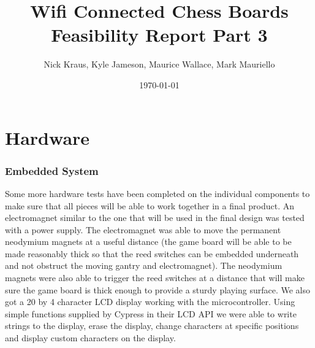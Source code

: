 \documentclass{article}
\title{Wifi Connected Chess Boards \\ \large Feasibility Report Part 3}
\author{Nick Kraus, Kyle Jameson, Maurice Wallace, Mark Mauriello}
\date{\today}
\begin{document}
\maketitle


\section*{Hardware}

\subsubsection*{Embedded System}
\indent

Some more hardware tests have been completed on the individual components to make sure that all pieces will be able to work together in a final product. An electromagnet similar to the one that will be used in the final design was tested with a power supply. The electromagnet was able to move the permanent neodymium magnets at a useful distance (the game board will be able to be made reasonably thick so that the reed switches can be embedded underneath and not obstruct the moving gantry and electromagnet). The neodymium magnets were also able to trigger the reed switches at a distance that will make sure the game board is thick enough to provide a sturdy playing surface. We also got a 20 by 4 character LCD display working with the microcontroller. Using simple functions supplied by Cypress in their LCD API we were able to write strings to the display, erase the display, change characters at specific positions and display custom characters on the display.

\indent
\end{document}
